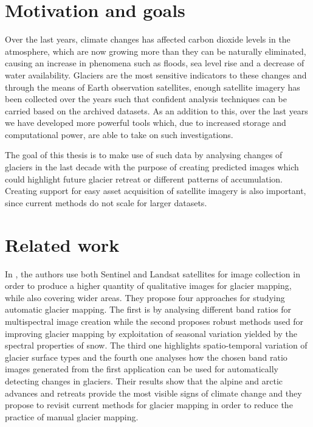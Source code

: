 \documentclass[12pt, a4paper]{report}
\begin{document}
	\section{Motivation and goals}
	
	\par Over the last years, climate changes has affected carbon dioxide levels in the atmosphere, which are now growing more than they can be naturally eliminated, causing an increase in  phenomena such as floods, sea level rise and a decrease of water availability. Glaciers are the most sensitive indicators to these changes and through the means of Earth observation satellites, enough satellite imagery has been collected over the years such that confident analysis techniques can be carried based on the archived datasets. As an addition to this, over the last years we have developed more powerful tools which, due to increased storage and computational power, are able to take on such investigations.

	\par The goal of this thesis is to make use of such data by analysing changes of glaciers in the last decade with the purpose of creating predicted images which could highlight future glacier retreat or different patterns of accumulation. Creating support for easy asset acquisition of satellite imagery is also important, since current methods do not scale for larger datasets.

	\section{Related work}
	
	\par In \cite{WINSVOLD2016}, the authors use both Sentinel and Landsat satellites for image collection in order to produce a higher quantity of qualitative images for glacier mapping, while also covering wider areas. They propose four approaches for studying automatic glacier mapping. The first is by analysing different band ratios for multispectral image creation while the second proposes robust methods used for improving glacier mapping by exploitation of seasonal variation yielded by the spectral properties of snow. The third one highlights spatio-temporal variation of glacier surface types and the fourth one analyses how the chosen band ratio images generated from the first application can be used for automatically detecting changes in glaciers. Their results show that the alpine and arctic advances and retreats provide the most visible signs of climate change and they propose to revisit current methods for glacier mapping in order to reduce the practice of manual glacier mapping.
	
\end{document}
